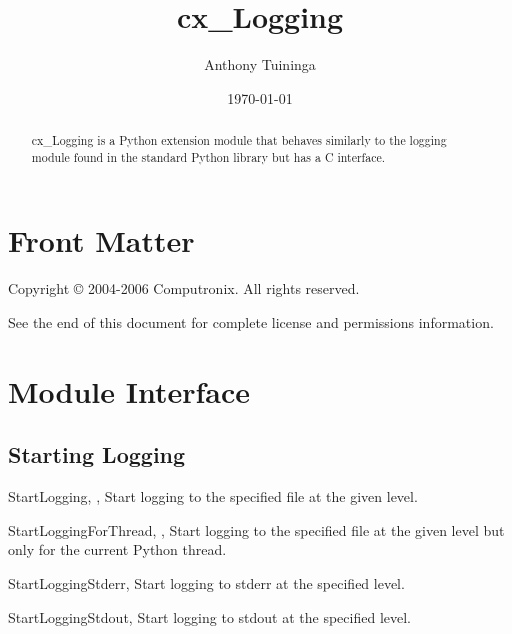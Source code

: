 \documentclass{manual}
\title{cx\_Logging}
\author{Anthony Tuininga}
\date{\today}                   %
\begin{document}
\maketitle

\ifhtml
\chapter*{Front Matter\label{front}}
\fi

Copyright \copyright{} 2004-2006 Computronix.
All rights reserved.

See the end of this document for complete license and permissions
information.

\begin{abstract}

\noindent
cx\_Logging is a Python extension module that behaves similarly to the logging
module found in the standard Python library but has a C interface.

\end{abstract}

\tableofcontents

\chapter{Module Interface\label{module}}

\section{Starting Logging \label{pyStartLogging}}

\begin{funcdesc}{StartLogging}{, ,
    }
  Start logging to the specified file at the given level.
\end{funcdesc}

\begin{funcdesc}{StartLoggingForThread}{, ,
    }
  Start logging to the specified file at the given level but only for the
  current Python thread.
\end{funcdesc}

\begin{funcdesc}{StartLoggingStderr}{, }
  Start logging to stderr at the specified level.
\end{funcdesc}

\begin{funcdesc}{StartLoggingStdout}{, }
  Start logging to stdout at the specified level.
\end{funcdesc}
\end{document}
